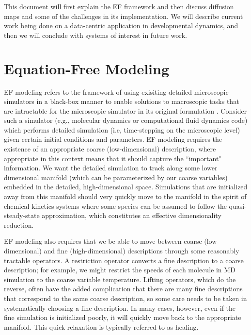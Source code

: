 \documentclass[12pt]{article}
\begin{document}
This document will first explain the EF framework and then discuss diffusion maps and some of the challenges in its implementation. We will describe current work being done on a data-centric application in developmental dynamics, and then we will conclude with systems of interest in future work.  \vspace{1mm}

\section{Equation-Free Modeling}

EF modeling refers to the framework of using exisiting detailed microscopic simulators in a black-box manner to enable solutions to macroscopic tasks that are intractable for the microscopic simulator in its original formulation \cite{Siettos2003, Kevrekidis2003, Kevrekidis2004}. Consider such a simulator (e.g., molecular dynamics or computational fluid dynamics code) which performs detailed simulation (i.e, time-stepping on the microscopic level) given certain initial conditions and parameters. EF modeling requires the existence of an appropriate coarse (low-dimensional) description, where appropriate in this context means that it should capture the ``important" information. We want the detailed simulation to track along some lower dimensional manifold (which can be parameterized by our coarse variables) embedded in the detailed, high-dimensional space. Simulations that are initialized away from this manifold should very quickly move to the manifold in the spirit of chemical kinetics systems where some species can be assumed to follow the quasi-steady-state approximation, which constitutes an effective dimensionality reduction. \vspace{1mm}

EF modeling also requires that we be able to move between coarse (low-dimensional) and fine (high-dimensional) descriptions through some reasonably tractable operators. A restriction operator converts a fine description to a coarse description; for example, we might restrict the speeds of each molecule in MD simulation to the coarse variable temperature. Lifting operators, which do the reverse, often have the added complication that there are many fine descriptions that correspond to the same coarse description, so some care needs to be taken in systematically choosing a fine description. In many cases, however, even if the fine simulation is initialized poorly, it will quickly move back to the appropriate manifold. This quick relaxation is typically referred to as healing. \vspace{1mm}
\end{document}
